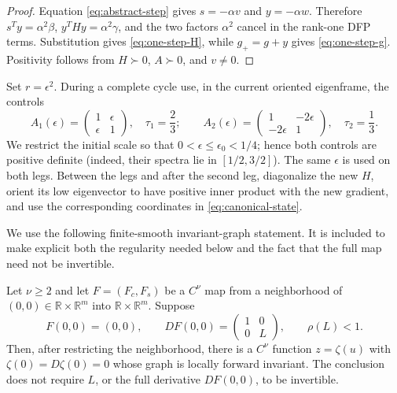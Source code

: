 \documentclass[smallextended,envcountsame]{svjour3}
\newcommand{\R}{\mathbb R}
\begin{document}
\begin{proof}
Equation \eqref{eq:abstract-step} gives
$s=-\alpha v$ and $y=-\alpha w$.  Therefore
$s^Ty=\alpha^2\beta$, $y^THy=\alpha^2\gamma$, and the two factors
$\alpha^2$ cancel in the rank-one DFP terms.  Substitution gives
\eqref{eq:one-step-H}, while $g_+=g+y$ gives
\eqref{eq:one-step-g}.  Positivity follows from $H\succ0$, $A\succ0$, and
$v\ne0$.
\end{proof}

Set $r=\epsilon^2$.  During a complete cycle use, in the current oriented
eigenframe, the controls
\begin{equation}\label{eq:two-controls}
A_1(\epsilon)=
\begin{pmatrix}1&\epsilon\\ \epsilon&1\end{pmatrix},
\quad \tau_1=\frac23;
\qquad
A_2(\epsilon)=
\begin{pmatrix}1&-2\epsilon\\ -2\epsilon&1\end{pmatrix},
\quad \tau_2=\frac13.
\end{equation}
We restrict the initial scale so that
$0<\epsilon\le\epsilon_0<1/4$; hence both controls are positive definite
(indeed, their spectra lie in $[1/2,3/2]$).
The same $\epsilon$ is used on both legs.  Between the legs and after the
second leg, diagonalize the new $H$, orient its low eigenvector to have
positive inner product with the new gradient, and use the corresponding
coordinates in \eqref{eq:canonical-state}.

We use the following finite-smooth invariant-graph statement.  It is included
to make explicit both the regularity needed below and the fact that the full
map need not be invertible.

\begin{lemma}\label{lem:graph-transform}
Let $\nu\ge2$ and let $F=(F_c,F_s)$ be a $C^\nu$ map from a neighborhood of
$(0,0)\in\R\times\R^m$ into $\R\times\R^m$.  Suppose
\[
F(0,0)=(0,0),\qquad
DF(0,0)=\begin{pmatrix}1&0\\0&L\end{pmatrix},
\qquad \rho(L)<1.
\]
Then, after restricting the neighborhood, there is a $C^\nu$ function
$z=\zeta(u)$ with $\zeta(0)=D\zeta(0)=0$ whose graph is locally forward
invariant.  The conclusion does not require $L$, or the full derivative
$DF(0,0)$, to be invertible.
\end{lemma}
\end{document}

